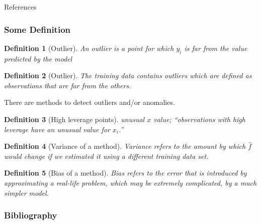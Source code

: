 \documentclass[serif, xcolor={dvipsnames}]{beamer} %
\newtheorem{deff}{Definition}
\begin{document}
\begin{frame}[allowframebreaks,t]{References} 
\frametitle{Some Definition}

\begin{deff}[Outlier] An outlier is a point for which $y_i$ is far from the value predicted by the model
\end{deff}

\begin{deff}[Outlier] The training data contains outliers which are defined as observations that are far from the others.
\end{deff}

There are methods to detect outliers and/or anomalies.

\begin{deff}[High leverage points] unusual $x$ value; ``observations with high leverage have an unusual value for $x_i$.''
\end{deff}

\begin{deff}[Variance of a method] Variance refers to the amount by which
$\hat f$ would change if we estimated it using a different training data set.
\end{deff}

\begin{deff}[Bias of a method] Bias refers to the error that is introduced by approximating a real-life problem, which may be extremely complicated, by a much simpler model.
\end{deff}
\end{frame}


\begin{frame}
\frametitle{Bibliography}
\nocite{*}
\printbibliography

\end{frame}
\end{document}
